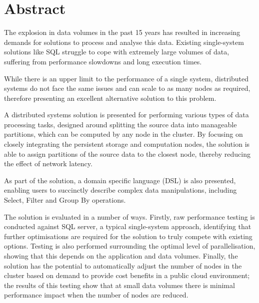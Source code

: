 \chapter*{Abstract}

The explosion in data volumes in the past 15 years has resulted in increasing demands for solutions to process and analyse this data. Existing single-system solutions like SQL struggle to cope with extremely large volumes of data, suffering from performance slowdowns and long execution times. 

While there is an upper limit to the performance of a single system, distributed systems do not face the same issues and can scale to as many nodes as required, therefore presenting an excellent alternative solution to this problem.

A distributed systems solution is presented for performing various types of data processing tasks, designed around splitting the source data into manageable partitions, which can be computed by any node in the cluster. By focusing on closely integrating the persistent storage and computation nodes, the solution is able to assign partitions of the source data to the closest node, thereby reducing the effect of network latency. 

As part of the solution, a domain specific language (DSL) is also presented, enabling users to succinctly describe complex data manipulations, including Select, Filter and Group By operations.

The solution is evaluated in a number of ways. Firstly, raw performance testing is conducted against SQL server, a typical single-system approach, identifying that further optimisations are required for the solution to truly compete with existing options. Testing is also performed surrounding the optimal level of parallelisation, showing that this depends on the application and data volumes. Finally, the solution has the potential to automatically adjust the number of nodes in the cluster based on demand to provide cost benefits in a public cloud environment; the results of this testing show that at small data volumes there is minimal performance impact when the number of nodes are reduced.

